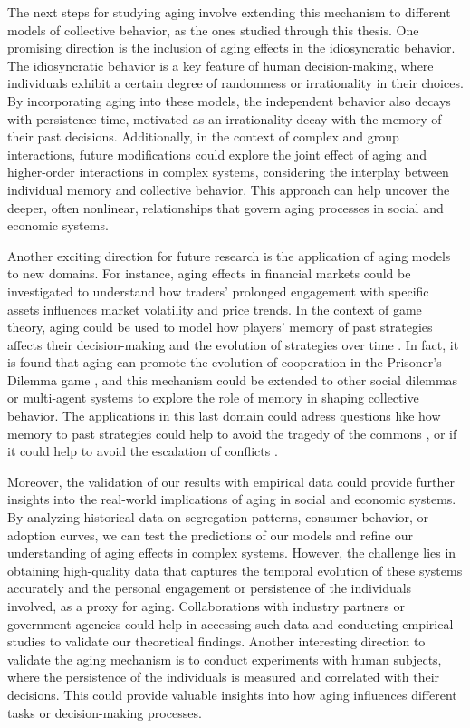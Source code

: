 The next steps for studying aging involve extending this mechanism to different models of collective behavior, as the ones studied through this thesis. One promising direction is the inclusion of aging effects in the idiosyncratic behavior. The idiosyncratic behavior is a key feature of human decision-making, where individuals exhibit a certain degree of randomness or irrationality in their choices. By incorporating aging into these models, the independent behavior also decays with persistence time, motivated as an irrationality decay with the memory of their past decisions. Additionally, in the context of complex and group interactions, future modifications could explore the joint effect of aging and higher-order interactions in complex systems, considering the interplay between individual memory and collective behavior. This approach can help uncover the deeper, often nonlinear, relationships that govern aging processes in social and economic systems. 

Another exciting direction for future research is the application of aging models to new domains. For instance, aging effects in financial markets could be investigated to understand how traders' prolonged engagement with specific assets influences market volatility and price trends. In the context of game theory, aging could be used to model how players' memory of past strategies affects their decision-making and the evolution of strategies over time \cite{samuele-ciardella-2023}. In fact, it is found that aging can promote the evolution of cooperation in the Prisoner's Dilemma game \cite{attila-2009}, and this mechanism could be extended to other social dilemmas or multi-agent systems to explore the role of memory in shaping collective behavior. The applications in this last domain could adress questions like how memory to past strategies could help to avoid the tragedy of the commons \cite{ostrom1990governing}, or if it could help to avoid the escalation of conflicts \cite{axelrod1981evolution}.

Moreover, the validation of our results with empirical data could provide further insights into the real-world implications of aging in social and economic systems. By analyzing historical data on segregation patterns, consumer behavior, or adoption curves, we can test the predictions of our models and refine our understanding of aging effects in complex systems. However, the challenge lies in obtaining high-quality data that captures the temporal evolution of these systems accurately and the personal engagement or persistence of the individuals involved, as a proxy for aging. Collaborations with industry partners or government agencies could help in accessing such data and conducting empirical studies to validate our theoretical findings. Another interesting direction to validate the aging mechanism is to conduct experiments with human subjects, where the persistence of the individuals is measured and correlated with their decisions. This could provide valuable insights into how aging influences different tasks or decision-making processes.

